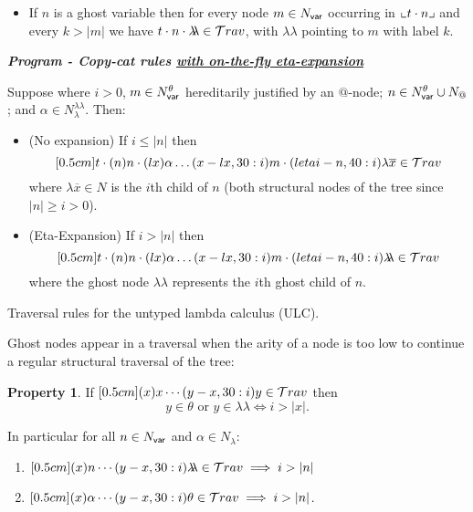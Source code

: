 \documentclass{article}
\theoremstyle{definition}
\newtheorem{property}{Property}[section]
\newcommand\Nodes{N}%
\newcommand\NodesVar{N_{\sf var}}%
\newcommand\NodesLmd{N_\lambda}%
\newcommand{\ghostlmd}{{\lambda\!\!\lambda}}
\newcommand{\ghostvar}{\theta}
\begin{document}
\begin{FramedTable}
\begin{itemize}[]
\item {} If $n$ is a ghost variable then
for every node $m\in \NodesVar$ occurring in $\llcorner t\cdot n \lrcorner$ and every $k>|m|$ we have $t \cdot n \cdot \ghostlmd \in\travset$, with $\ghostlmd$ pointing to $m$ with label $k$.
\end{itemize}

\emph{\bf Program - Copy-cat rules \underline{with on-the-fly eta-expansion}}

Suppose  where $i>0$, $m \in \NodesVar^\ghostvar$ hereditarily justified by an $@$-node;
     $n \in \NodesVar^\ghostvar \union \Nodes_{@}$; and $\alpha \in \NodesLmd^\ghostlmd$. Then:

\begin{itemize}
  \item {} (No expansion) If $i \leq |n|$ then
  $$\Pstr[0.5cm]{ t  \cdot
(n){n} \cdot (lx){\alpha}  \ldots (x-lx,30:i){m}
    \cdot (letai-n,40:i){\lambda \overline{x}}
     \in\travset}$$
where $\lambda \overline{x} \in N$ is the $i$th child of $n$
(both structural nodes of the tree since $|n|\geq i>0$).

\item {} (Eta-Expansion) If $i > |n|$ then
  $$\Pstr[0.5cm]{ t \cdot
(n){n} \cdot (lx){\alpha}  \ldots (x-lx,30:i){m}
    \cdot (letai-n,40:i){\ghostlmd}
     \in\travset}$$
     where the ghost node $\ghostlmd$ represents the $i$th ghost child of $n$.
\end{itemize}

\caption{Traversal rules for the untyped lambda calculus (ULC).}
 \label{tab:trav_rules}
\end{FramedTable}

Ghost nodes appear in a traversal when the arity of a node is too low to continue a regular
structural traversal of the tree:
\begin{property}
If $\Pstr[0.5cm]{(x){x} \cdots (y-x,30:i){y}} \in \travset$ then
$$ y \in \ghostvar \mbox{ or } y \in\ghostlmd \iff i > |x|.$$

In particular for all $n\in\NodesVar$ and $\alpha\in\NodesLmd$:
\begin{enumerate}
\item $\Pstr[0.5cm]{(x){n} \cdots (y-x,30:i){\ghostlmd}} \in \travset \implies i > |n|$
\item $\Pstr[0.5cm]{(x){\alpha} \cdots (y-x,30:i){\ghostvar}} \in \travset \implies i > |n|$.
\end{enumerate}
\end{property}
\end{document}
